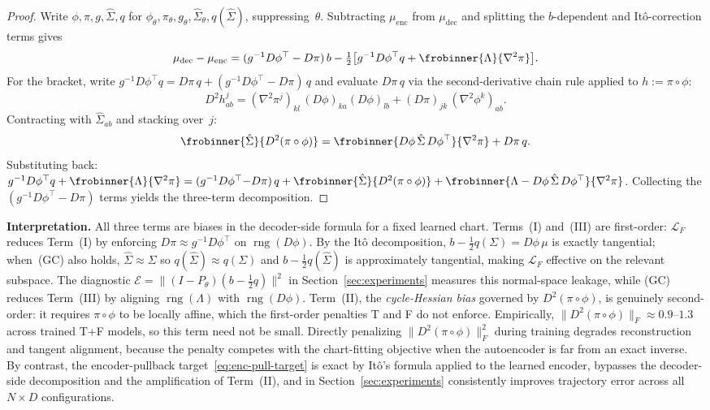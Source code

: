 \documentclass[11pt]{article}
\newcommand{\cE}{\mathcal{E}}
\newcommand{\cL}{\mathcal{L}}
\newcommand{\rng}{\operatorname{rng}}
\newcommand{\norm}[1]{\lVert#1\rVert}
\begin{document}
\begin{proof}
Write $\phi,\pi,g,\hat\Sigma,q$ for
$\phi_\theta,\pi_\theta,g_\theta,\hat\Sigma_\theta,q(\hat\Sigma)$,
suppressing~$\theta$.
Subtracting $\mu_{\mathrm{enc}}$ from $\mu_{\mathrm{dec}}$ and
splitting the $b$-dependent and It\^o-correction terms gives
\[
  \mu_{\mathrm{dec}} - \mu_{\mathrm{enc}}
  = (g^{-1}D\phi^\top - D\pi)\,b
    - \tfrac{1}{2}\bigl[
      g^{-1}D\phi^\top q
      + \frobinner{\Lambda}{\nabla^2\pi}
    \bigr].
\]
For the bracket, write
$g^{-1}D\phi^\top q = D\pi\,q + (g^{-1}D\phi^\top{-}D\pi)\,q$
and evaluate $D\pi\,q$ via the second-derivative chain rule
applied to $h:=\pi\circ\phi$:
\[
  D^2 h^j_{ab}
  = (\nabla^2\pi^j)_{kl}\,(D\phi)_{ka}(D\phi)_{lb}
    + (D\pi)_{jk}\,(\nabla^2\phi^k)_{ab}.
\]
Contracting with $\hat\Sigma_{ab}$ and stacking over~$j$:
\[
  \frobinner{\hat\Sigma}{D^2(\pi\circ\phi)}
  = \frobinner{D\phi\,\hat\Sigma\,D\phi^\top}{\nabla^2\pi}
    + D\pi\,q.
\]
Substituting back:
$g^{-1}D\phi^\top q + \frobinner{\Lambda}{\nabla^2\pi}
= (g^{-1}D\phi^\top{-}D\pi)\,q
  + \frobinner{\hat\Sigma}{D^2(\pi\circ\phi)}
  + \frobinner{\Lambda - D\phi\,\hat\Sigma\,D\phi^\top}{\nabla^2\pi}$.
Collecting the $(g^{-1}D\phi^\top{-}D\pi)$ terms yields the
three-term decomposition.
\end{proof}

\noindent\textbf{Interpretation.}
All three terms are biases in the decoder-side formula
for a fixed learned chart.
Terms~(I) and~(III) are first-order:
$\cL_F$ reduces Term~(I) by enforcing
$D\pi\approx g^{-1}D\phi^\top$ on $\rng(D\phi)$.
By the It\^o decomposition,
$b-\tfrac12 q(\Sigma)=D\phi\,\mu$ is exactly tangential;
when~(GC) also holds,
$\hat\Sigma\approx\Sigma$ so
$q(\hat\Sigma)\approx q(\Sigma)$ and
$b-\tfrac12 q(\hat\Sigma)$ is approximately tangential,
making $\cL_F$ effective on the relevant subspace.
The diagnostic
$\cE=\|(I-P_\theta)(b-\tfrac12 q)\|^2$
in Section~\ref{sec:experiments} measures this
normal-space leakage, while (GC) reduces Term~(III)
by aligning $\rng(\Lambda)$ with $\rng(D\phi)$.
Term~(II), the \emph{cycle-Hessian bias} governed by
$D^2(\pi\circ\phi)$, is genuinely second-order: it
requires $\pi\circ\phi$ to be locally affine, which the
first-order penalties T and F do not enforce.
Empirically, $\norm{D^2(\pi\circ\phi)}_F\approx
0.9$--$1.3$ across trained T+F models, so this term
need not be small.
Directly penalizing $\norm{D^2(\pi\circ\phi)}_F^2$
during training degrades reconstruction and tangent
alignment, because the penalty competes with the
chart-fitting objective when the autoencoder is far
from an exact inverse.
By contrast, the encoder-pullback
target~\eqref{eq:enc-pull-target} is exact by It\^o's
formula applied to the learned encoder, bypasses the
decoder-side decomposition and the amplification of
Term~(II), and in Section~\ref{sec:experiments}
consistently improves trajectory error across all
$N{\times}D$ configurations.
\end{document}
